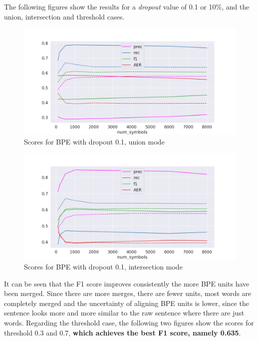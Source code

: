 The following figures show the results for a \emph{dropout} value of 0.1 or 10\%, and the union, intersection and threshold cases.

 \begin{figure}[!ht]
     \centering
     \includegraphics[width=12cm]{../reports/scores_dropout_bpe/space/0.1/union_fastalign.png}
     \caption{Scores for BPE with dropout 0.1, union mode}
 \end{figure}
 
 \begin{figure}[!ht]
     \centering
     \includegraphics[width=11.5cm]{../reports/scores_dropout_bpe/space/0.1/inter_fastalign.png}
     \caption{Scores for BPE with dropout 0.1, intersection mode}
 \end{figure}

It can be seen that the F1 score improves consistently the more BPE units have been merged. Since there are more merges, there are fewer units, most words are completely merged and the uncertainty of aligning BPE units is lower, since the sentence looks more and more similar to the raw sentence where there are just words. Regarding the threshold case, the following two figures show the scores for threshold 0.3 and 0.7, \textbf{which achieves the best F1 score, namely 0.635}.

